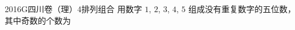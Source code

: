 
\begin{problem}{2016}{G}{四川卷（理）}{4}{排列组合}
用数字 $ 1 $, $ 2 $, $ 3 $, $ 4 $, $ 5 $ 组成没有重复数字的五位数，其中奇数的个数为
\begin{choices}
\end{choices}
\end{problem}

\begin{answer}

\end{answer}

\begin{solutions}

\end{solutions}